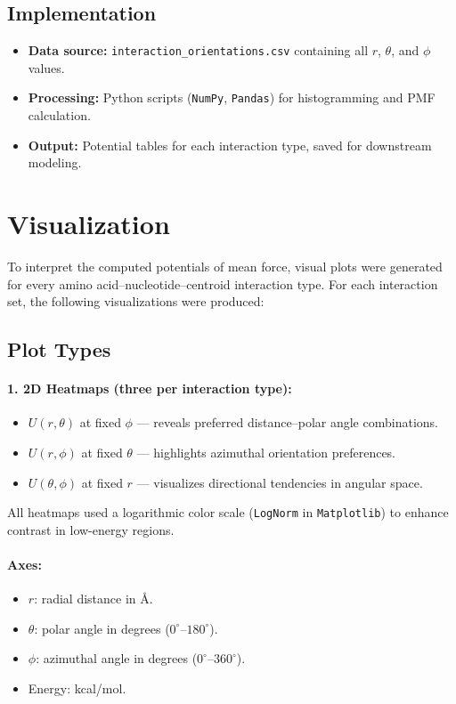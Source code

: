 \documentclass[12pt,a4paper]{report}
\begin{document}
\subsection*{Implementation}

\begin{itemize}
    \item \textbf{Data source:} \texttt{interaction\_orientations.csv} containing all $r$, $\theta$, and $\phi$ values.
    \item \textbf{Processing:} Python scripts (\texttt{NumPy}, \texttt{Pandas}) for histogramming and PMF calculation.
    \item \textbf{Output:} Potential tables for each interaction type, saved for downstream modeling.
\end{itemize}

\newpage
\section*{Visualization}

To interpret the computed potentials of mean force, visual plots were generated for every amino acid--nucleotide--centroid interaction type.  
For each interaction set, the following visualizations were produced:

\subsection*{Plot Types}

\paragraph{1. 2D Heatmaps (three per interaction type):}
\begin{itemize}
    \item $U(r, \theta)$ at fixed $\phi$ — reveals preferred distance--polar angle combinations.
    \item $U(r, \phi)$ at fixed $\theta$ — highlights azimuthal orientation preferences.
    \item $U(\theta, \phi)$ at fixed $r$ — visualizes directional tendencies in angular space.
\end{itemize}

All heatmaps used a logarithmic color scale (\texttt{LogNorm} in \texttt{Matplotlib}) to enhance contrast in low-energy regions.

\paragraph{Axes:}
\begin{itemize}
    \item $r$: radial distance in \AA{}.
    \item $\theta$: polar angle in degrees ($0^\circ$--$180^\circ$).
    \item $\phi$: azimuthal angle in degrees ($0^\circ$--$360^\circ$).
    \item Energy: kcal/mol.
\end{itemize}
\end{document}
